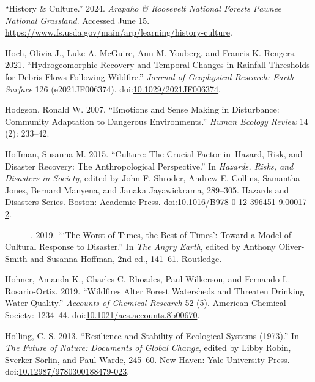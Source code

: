 \documentclass[
]{article}
\newlength{\cslhangindent}
\newenvironment{CSLReferences}[2] %
 {\begin{list}{}{%
  \setlength{\itemindent}{0pt}
  \setlength{\leftmargin}{0pt}
  \setlength{\parsep}{0pt}
  \ifodd #1
   \setlength{\leftmargin}{\cslhangindent}
   \setlength{\itemindent}{-1\cslhangindent}
  \fi
  \setlength{\itemsep}{#2\baselineskip}}}
 {\end{list}}
\begin{document}
\begin{CSLReferences}{1}{0}
{``History \& {Culture}.''} 2024. \emph{Arapaho \& Roosevelt National Forests Pawnee National Grassland}. Accessed June 15. \url{https://www.fs.usda.gov/main/arp/learning/history-culture}.

Hoch, Olivia J., Luke A. McGuire, Ann M. Youberg, and Francis K. Rengers. 2021. {``Hydrogeomorphic {Recovery} and {Temporal Changes} in {Rainfall Thresholds} for {Debris Flows Following Wildfire}.''} \emph{Journal of Geophysical Research: Earth Surface} 126 (e2021JF006374). doi:\href{https://doi.org/10.1029/2021JF006374}{10.1029/2021JF006374}.

Hodgson, Ronald W. 2007. {``Emotions and {Sense Making} in {Disturbance}: {Community Adaptation} to {Dangerous Environments}.''} \emph{Human Ecology Review} 14 (2): 233--42.

Hoffman, Susanna M. 2015. {``Culture: {The Crucial Factor} in~{Hazard}, {Risk}, and {Disaster Recovery}: {The Anthropological Perspective}.''} In \emph{Hazards, {Risks}, and {Disasters} in {Society}}, edited by John F. Shroder, Andrew E. Collins, Samantha Jones, Bernard Manyena, and Janaka Jayawickrama, 289--305. Hazards and {Disasters Series}. Boston: Academic Press. doi:\href{https://doi.org/10.1016/B978-0-12-396451-9.00017-2}{10.1016/B978-0-12-396451-9.00017-2}.

---------. 2019. {``{`{The Worst} of {Times}, the {Best} of {Times}'}: {Toward} a {Model} of {Cultural Response} to {Disaster}.''} In \emph{The {Angry Earth}}, edited by Anthony Oliver-Smith and Susanna Hoffman, 2nd ed., 141--61. Routledge.

Hohner, Amanda K., Charles C. Rhoades, Paul Wilkerson, and Fernando L. Rosario-Ortiz. 2019. {``Wildfires {Alter Forest Watersheds} and {Threaten Drinking Water Quality}.''} \emph{Accounts of Chemical Research} 52 (5). American Chemical Society: 1234--44. doi:\href{https://doi.org/10.1021/acs.accounts.8b00670}{10.1021/acs.accounts.8b00670}.

Holling, C. S. 2013. {``Resilience and {Stability} of {Ecological Systems} (1973).''} In \emph{The {Future} of {Nature}: {Documents} of {Global Change}}, edited by Libby Robin, Sverker Sörlin, and Paul Warde, 245--60. New Haven: Yale University Press. doi:\href{https://doi.org/10.12987/9780300188479-023}{10.12987/9780300188479-023}.


\end{CSLReferences}
\end{document}
